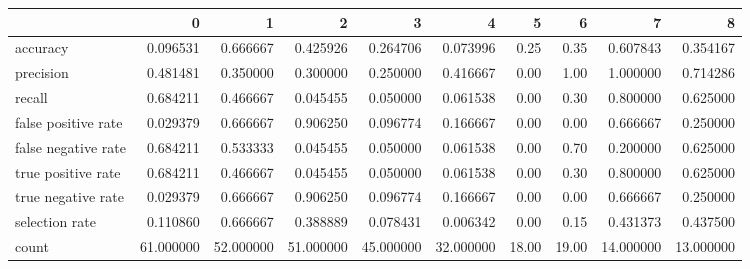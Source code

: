 \begin{tabular}{lrrrrrrrrr}
\toprule
{} &          0 &          1 &          2 &          3 &          4 &      5 &      6 &          7 &          8 \\
\midrule
accuracy            &   0.096531 &   0.666667 &   0.425926 &   0.264706 &   0.073996 &   0.25 &   0.35 &   0.607843 &   0.354167 \\
precision           &   0.481481 &   0.350000 &   0.300000 &   0.250000 &   0.416667 &   0.00 &   1.00 &   1.000000 &   0.714286 \\
recall              &   0.684211 &   0.466667 &   0.045455 &   0.050000 &   0.061538 &   0.00 &   0.30 &   0.800000 &   0.625000 \\
false positive rate &   0.029379 &   0.666667 &   0.906250 &   0.096774 &   0.166667 &   0.00 &   0.00 &   0.666667 &   0.250000 \\
false negative rate &   0.684211 &   0.533333 &   0.045455 &   0.050000 &   0.061538 &   0.00 &   0.70 &   0.200000 &   0.625000 \\
true positive rate  &   0.684211 &   0.466667 &   0.045455 &   0.050000 &   0.061538 &   0.00 &   0.30 &   0.800000 &   0.625000 \\
true negative rate  &   0.029379 &   0.666667 &   0.906250 &   0.096774 &   0.166667 &   0.00 &   0.00 &   0.666667 &   0.250000 \\
selection rate      &   0.110860 &   0.666667 &   0.388889 &   0.078431 &   0.006342 &   0.00 &   0.15 &   0.431373 &   0.437500 \\
count               &  61.000000 &  52.000000 &  51.000000 &  45.000000 &  32.000000 &  18.00 &  19.00 &  14.000000 &  13.000000 \\
\bottomrule
\end{tabular}
